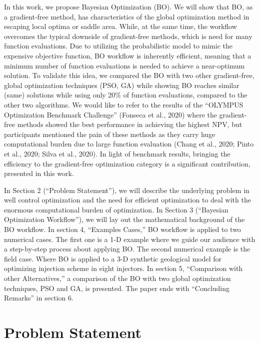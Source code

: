 \documentclass[]{elsarticle} %
\begin{document}
In this work, we propose Bayesian Optimization (BO). We will show that BO, as a gradient-free method, has characteristics of the global optimization method in escaping local optima or saddle area. While, at the same time, the workflow overcomes the typical downside of gradient-free methods, which is need for many function evaluations. Due to utilizing the probabilistic model to mimic the expensive objective function, BO workflow is inherently efficient, meaning that a minimum number of function evaluations is needed to achieve a near-optimum solution. To validate this idea, we compared the BO with two other gradient-free, global optimization techniques (PSO, GA) while showing BO reaches similar (same) solutions while using only 20\% of function evaluations, compared to the other two algorithms. We would like to refer to the results of the ``OLYMPUS Optimization Benchmark Challenge'' (Fonseca et al., 2020) where the gradient-free methods showed the best performance in achieving the highest NPV, but participants mentioned the pain of these methods as they carry huge computational burden due to large function evaluation (Chang et al., 2020; Pinto et al., 2020; Silva et al., 2020). In light of benchmark results, bringing the efficiency to the gradient-free optimization category is a significant contribution, presented in this work.

In Section 2 (``Problem Statement''), we will describe the underlying problem in well control optimization and the need for efficient optimization to deal with the enormous computational burden of optimization. In Section 3 (``Bayesian Optimization Workflow''), we will lay out the mathematical background of the BO workflow. In section 4, ``Examples Cases,'' BO workflow is applied to two numerical cases. The first one is a 1-D example where we guide our audience with a step-by-step process about applying BO. The second numerical example is the field case. Where BO is applied to a 3-D synthetic geological model for optimizing injection scheme in eight injectors. In section 5, ``Comparison with other Alternatives,'' a comparison of the BO with two global optimization techniques, PSO and GA, is presented. The paper ends with ``Concluding Remarks'' in section 6.

\newpage

\hypertarget{problem-statement}{%
\section{Problem Statement}\label{problem-statement}}
\end{document}
